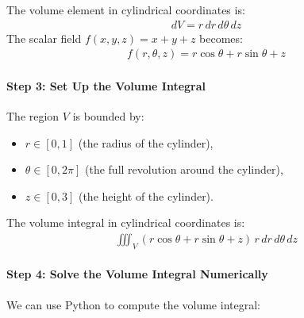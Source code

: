 \documentclass[letterpaper,10pt,english]{jupyterBook}
\begin{document}
\sphinxAtStartPar
The volume element in cylindrical coordinates is:
\begin{equation*}
\begin{split}
dV = r \, dr \, d\theta \, dz
\end{split}
\end{equation*}
\sphinxAtStartPar
The scalar field \( f(x, y, z) = x + y + z \) becomes:
\begin{equation*}
\begin{split}
f(r, \theta, z) = r \cos\theta + r \sin\theta + z
\end{split}
\end{equation*}

\paragraph{Step 3: Set Up the Volume Integral}
\label{\detokenize{prerequisites:step-3-set-up-the-volume-integral}}
\sphinxAtStartPar
The region \( V \) is bounded by:
\begin{itemize}
\item {} 
\sphinxAtStartPar
\( r \in [0, 1] \) (the radius of the cylinder),

\item {} 
\sphinxAtStartPar
\( \theta \in [0, 2\pi] \) (the full revolution around the cylinder),

\item {} 
\sphinxAtStartPar
\( z \in [0, 3] \) (the height of the cylinder).

\end{itemize}

\sphinxAtStartPar
The volume integral in cylindrical coordinates is:
\begin{equation*}
\begin{split}
\iiint_V (r \cos\theta + r \sin\theta + z) \, r \, dr \, d\theta \, dz
\end{split}
\end{equation*}

\paragraph{Step 4: Solve the Volume Integral Numerically}
\label{\detokenize{prerequisites:step-4-solve-the-volume-integral-numerically}}
\sphinxAtStartPar
We can use Python to compute the volume integral:
\end{document}
